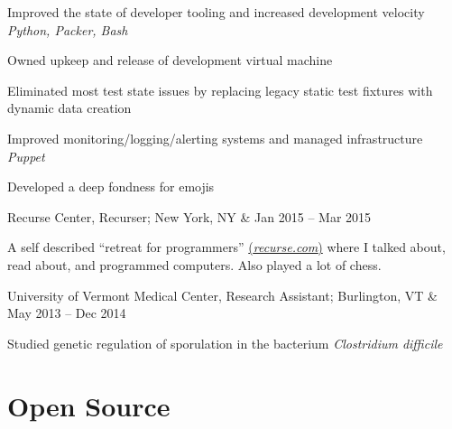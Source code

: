 \documentclass[letterpaper]{scrartcl}
\begin{document}
\begin{list1}
\begin{list2}
  \item Improved the state of developer tooling and increased development velocity \hfill \emph{Python, Packer, Bash}

    \begin{list3}
    \item Owned upkeep and release of development virtual machine
    \item Eliminated most test state issues by replacing legacy static test fixtures with dynamic data creation
    \end{list3}

  \item Improved monitoring/logging/alerting systems and managed infrastructure \hfill \emph{Puppet}
  \item Developed a deep fondness for emojis
  \end{list2}

\item \begin{tabular1bold} Recurse Center, Recurser; New York, NY &  Jan 2015 -- Mar 2015 \end{tabular1bold}

  \begin{list2}
  \item A self described ``retreat for programmers'' \href{recurse.com}{(\emph{recurse.com})} where I talked about, read about, and programmed computers. Also played a lot of chess.
  \end{list2}

\item \begin{tabular1bold} University of Vermont Medical Center, Research Assistant; Burlington, VT & May 2013 -- Dec 2014 \end{tabular1bold}

  \begin{list2}
  \item Studied genetic regulation of sporulation in the bacterium \emph{Clostridium difficile}
  \end{list2}

\end{list1}

%
%

\section*{Open Source}
\end{document}
